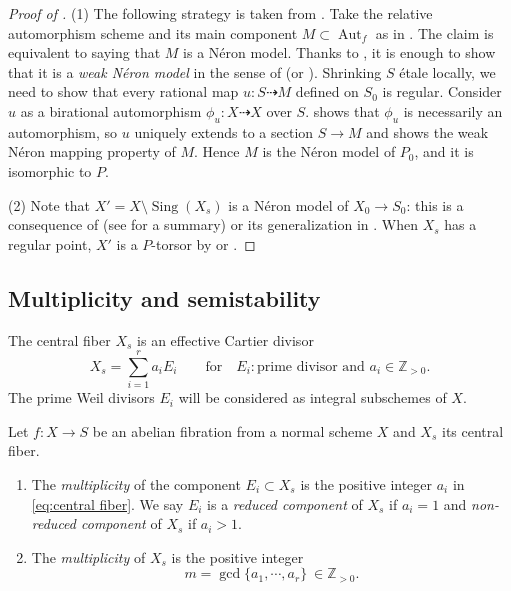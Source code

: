 \documentclass[reqno, letterpaper]{amsart}
\numberwithin{equation}{subsection}
\let\to\longrightarrow
\newcommand{\ZZ}{\mathbb{Z}}
\DeclareMathOperator{\Aut}{Aut}
\DeclareMathOperator{\Sing}{Sing}
\begin{document}
		\begin{proof} [Proof of ]
			(1) The following strategy is taken from \cite[\S 5]{kim24}. Take the relative automorphism scheme and its main component $M \subset \Aut_f$ as in . The claim is equivalent to saying that $M$ is a N\'eron model. Thanks to \cite[Theorem~7.1.1]{neron}, it is enough to show that it is a \emph{weak N\'eron model} in the sense of \cite[Definition~3.5.1 and Proposition~3.5.6]{neron} (or \cite[\S 3.6]{kim24}). Shrinking $S$ \'etale locally, we need to show that every rational map $u : S \dashrightarrow M$ defined on $S_0$ is regular. Consider $u$ as a birational automorphism $\phi_u : X \dashrightarrow X$ over $S$.  shows that $\phi_u$ is necessarily an automorphism, so $u$ uniquely extends to a section $S \to M$ and shows the weak N\'eron mapping property of $M$. Hence $M$ is the N\'eron model of $P_0$, and it is isomorphic to $P$.
			
			\medskip
			
			(2) Note that $X' = X \setminus \Sing(X_s)$ is a N\'eron model of $X_0 \to S_0$: this is a consequence of \cite[\S 1.3]{neron} (see \cite[Example~3.13]{kim24} for a summary) or its generalization in \cite[Corollary~2]{kol25:neron}. When $X_s$ has a regular point, $X'$ is a $P$-torsor by \cite[Corollary~6.5.3]{neron} or \cite[Proposition~3.21]{kim24}.
		\end{proof}
		
		
		
	\subsection{Multiplicity and semistability}
		The central fiber $X_s$ is an effective Cartier divisor
		\begin{equation} \label{eq:central fiber}
			X_s = \sum_{i=1}^r a_i E_i \qquad\mbox{for}\quad E_i : \mbox{prime divisor and } a_i \in \ZZ_{>0} .
		\end{equation}
		The prime Weil divisors $E_i$ will be considered as integral subschemes of $X$.
		
		\begin{definition}
			Let $f : X \to S$ be an abelian fibration from a normal scheme $X$ and $X_s$ its central fiber.
			\begin{enumerate}
				\item The \emph{multiplicity} of the component $E_i \subset X_s$ is the positive integer $a_i$ in \eqref{eq:central fiber}. We say $E_i$ is a \emph{reduced component} of $X_s$ if $a_i = 1$ and \emph{non-reduced component} of $X_s$ if $a_i > 1$.
				\item The \emph{multiplicity} of $X_s$ is the positive integer
				\[ m = \gcd \{ a_1, \cdots, a_r \} \ \in \ZZ_{>0} .\]
			\end{enumerate}
		\end{definition}
		
\end{document}
